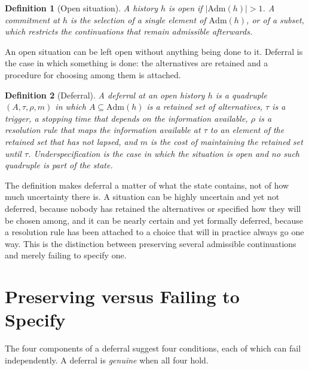 \documentclass[11pt]{article}
\newtheorem{definition}{Definition}
\theoremstyle{remark}
\begin{document}
\begin{definition}[Open situation]
A history $h$ is \emph{open} if $|\mathrm{Adm}(h)|>1$. A \emph{commitment} at $h$ is the selection of a single element of $\mathrm{Adm}(h)$, or of a subset, which restricts the continuations that remain admissible afterwards.
\end{definition}

An open situation can be left open without anything being done to it. Deferral is the case in which something is done: the alternatives are retained and a procedure for choosing among them is attached.

\begin{definition}[Deferral]
A \emph{deferral} at an open history $h$ is a quadruple $(A,\tau,\rho,m)$ in which $A\subseteq\mathrm{Adm}(h)$ is a retained set of alternatives, $\tau$ is a trigger, a stopping time that depends on the information available, $\rho$ is a resolution rule that maps the information available at $\tau$ to an element of the retained set that has not lapsed, and $m$ is the cost of maintaining the retained set until $\tau$. \emph{Underspecification} is the case in which the situation is open and no such quadruple is part of the state.
\end{definition}

The definition makes deferral a matter of what the state contains, not of how much uncertainty there is. A situation can be highly uncertain and yet not deferred, because nobody has retained the alternatives or specified how they will be chosen among, and it can be nearly certain and yet formally deferred, because a resolution rule has been attached to a choice that will in practice always go one way. This is the distinction between preserving several admissible continuations and merely failing to specify one.

\section{Preserving versus Failing to Specify}

The four components of a deferral suggest four conditions, each of which can fail independently. A deferral is \emph{genuine} when all four hold.
\end{document}
